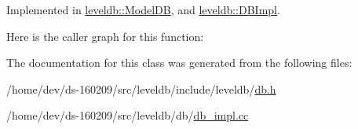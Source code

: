 Implemented in \hyperlink{classleveldb_1_1_model_d_b_ae3a20d2fc971376349b142b9c2d159be}{leveldb\+::\+Model\+D\+B}, and \hyperlink{classleveldb_1_1_d_b_impl_ac0d0b472717099d6a02ad9dace4e8ef4}{leveldb\+::\+D\+B\+Impl}.



Here is the caller graph for this function\+:




The documentation for this class was generated from the following files\+:\begin{DoxyCompactItemize}
\item 
/home/dev/ds-\/160209/src/leveldb/include/leveldb/\hyperlink{leveldb_2include_2leveldb_2db_8h}{db.\+h}\item 
/home/dev/ds-\/160209/src/leveldb/db/\hyperlink{db__impl_8cc}{db\+\_\+impl.\+cc}\end{DoxyCompactItemize}
